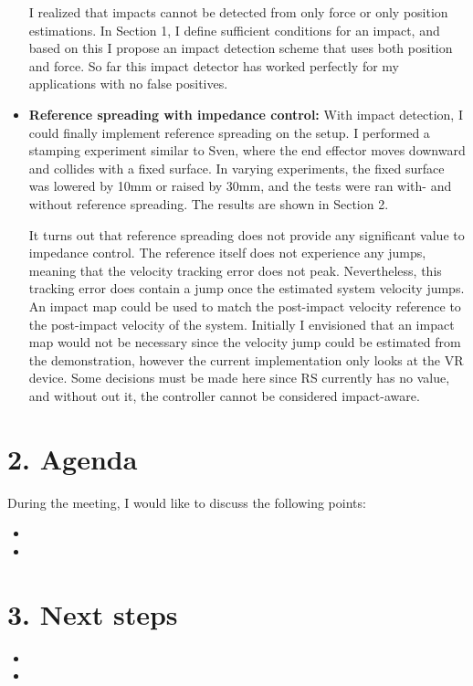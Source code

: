 \documentclass[11pt]{report}
\numberwithin{equation}{section}        %
\numberwithin{figure}{section}          %
\numberwithin{table}{section}           %
\begin{document}
\begin{itemize}
  I realized that impacts cannot be detected from only force or only position estimations. In Section 1, I define sufficient conditions for an impact, and based on this I propose an impact detection scheme that uses both position and force. So far this impact detector has worked perfectly for my applications with no false positives.

  \item \textbf{Reference spreading with impedance control:} With impact detection, I could finally implement reference spreading on the setup. I performed a stamping experiment similar to Sven, where the end effector moves downward and collides with a fixed surface. In varying experiments, the fixed surface was lowered by 10mm or raised by 30mm, and the tests were ran with- and without reference spreading. The results are shown in Section 2.

  It turns out that reference spreading does not provide any significant value to impedance control. The reference itself does not experience any jumps, meaning that the velocity tracking error does not peak. Nevertheless, this tracking error does contain a jump once the estimated system velocity jumps. An impact map could be used to match the post-impact velocity reference to the post-impact velocity of the system. Initially I envisioned that an impact map would not be necessary since the velocity jump could be estimated from the demonstration, however the current implementation only looks at the VR device. Some decisions must be made here since RS currently has no value, and without out it, the controller cannot be considered impact-aware.

  \end{itemize}

  \section*{2. Agenda}
  During the meeting, I would like to discuss the following points:

  \begin{itemize}
      \item  
      \item 
  \end{itemize}

  \section*{3. Next steps}

  \begin{itemize}
      \item  
      \item 
  \end{itemize}
\end{document}
